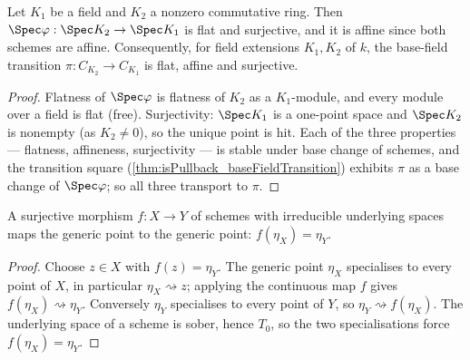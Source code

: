 \begin{lemma}
  \label{lem:baseFieldTransition_flat_affine_surjective}
  \leanok
  Let \(K_1\) be a field and \(K_2\) a nonzero commutative ring. Then
  \(\Spec\varphi : \Spec K_2 \to \Spec K_1\) is flat and surjective, and it is affine
  since both schemes are affine. Consequently, for field extensions \(K_1, K_2\) of
  \(k\), the base-field transition \(\pi : C_{K_2} \to C_{K_1}\) is flat, affine and
  surjective.
\end{lemma}
\begin{proof}
  \leanok
  Flatness of \(\Spec\varphi\) is flatness of \(K_2\) as a \(K_1\)-module, and every
  module over a field is flat (free). Surjectivity: \(\Spec K_1\) is a one-point space
  and \(\Spec K_2\) is nonempty (as \(K_2 \neq 0\)), so the unique point is hit. Each of
  the three properties --- flatness, affineness, surjectivity --- is stable under base
  change of schemes, and the transition square
  (\ref{thm:isPullback_baseFieldTransition}) exhibits \(\pi\) as a base change of
  \(\Spec\varphi\); so all three transport to \(\pi\).
\end{proof}

\begin{lemma}
  \label{lem:genericPoint_eq_of_surjective}
  \leanok
  A surjective morphism \(f : X \to Y\) of schemes with irreducible underlying spaces
  maps the generic point to the generic point: \(f(\eta_X) = \eta_Y\).
\end{lemma}
\begin{proof}
  \leanok
  Choose \(z \in X\) with \(f(z) = \eta_Y\). The generic point \(\eta_X\) specialises to
  every point of \(X\), in particular \(\eta_X \rightsquigarrow z\); applying the
  continuous map \(f\) gives \(f(\eta_X) \rightsquigarrow \eta_Y\). Conversely
  \(\eta_Y\) specialises to every point of \(Y\), so
  \(\eta_Y \rightsquigarrow f(\eta_X)\). The underlying space of a scheme is sober,
  hence \(T_0\), so the two specialisations force \(f(\eta_X) = \eta_Y\).
\end{proof}

